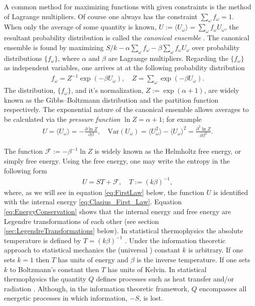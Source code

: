 \documentclass[english,12pt]{ttuthes}
\newcommand{\Fc}{\mathcal{F}}
\begin{document}
A common method for maximizing functions with given constraints is the
method of Lagrange multipliers. Of course one always has the
constraint $\sum_\omega f_\omega=1$. When only the average of some quantity is
known, $U:=\langle U_\omega\rangle=\sum_\omega f_\omega U_\omega$, the resultant probability 
distribution is called the \emph{canonical ensemble}
\cite{Robertson-1993}.  The canonical ensemble is found by maximizing 
$S/k-\alpha\sum_\omega f_\omega-\beta\sum_\omega f_\omega U_\omega$ over probability distributions 
$\{f_\omega\}$, where $\alpha$ and $\beta$ are Lagrange multipliers. Regarding the
$\{f_\omega\}$ as independent variables, one arrives at at the following
probability distribution
\cite{Robertson-1993,Balian:NCB:471,Firas}     
%
\begin{align}	\label{eq:Cannonical_Ensemble}
	f_\omega = Z^{-1}\exp{(-\beta U_\omega)}, \quad
	Z  = \sum_\omega \exp(-\beta U_\omega).
\end{align}
%
The distribution, $\{f_\omega\}$, and it's normalization, $Z:= \exp(\alpha+1)$,
are widely known as the Gibbs--Boltzmann distribution and the
partition function respectively. The exponential nature of 
the canonical ensemble allows averages to be calculated via the
\emph{pressure function} $\ln{Z}=\alpha+1$; for example
\cite{Robertson-1993,Chandler-1987} 
%
\begin{align}
  U=\langle U_\omega\rangle=-\frac{\partial\ln{Z}}{\partial\beta}, \quad
  \text{Var}(U_\omega)=\langle U_\omega^2\rangle-\langle U_\omega\rangle^2=\frac{\partial^2\ln{Z}}{\partial\beta^2}.
\end{align}
%

The function $\Fc:=-\beta^{-1}\ln{Z}$ is widely known as the
Helmholtz free energy, or simply free energy. Using the free energy,
one may write the entropy in the following form \cite{Robertson-1993}   
% 
\begin{align}
  \label{eq:EnergyConservation}
  U=ST+\Fc,   
      \quad T:=(k\beta)^{-1},
\end{align}
%
where, as we will see in equation \eqref{eq:FirstLaw} below, the
function $U$ is identified with the internal energy
\eqref{eq:Clasius_First_Law}. Equation \eqref{eq:EnergyConservation}
shows that the internal energy and free energy are Legendre
transformations of each other (see section
\ref{sec:LegendreTransformations} below). In statistical thermophysics
the absolute temperature is defined by $T=(k\beta)^{-1}$
\cite{Thompson-1988}. Under the information theoretic approach to
statistical mechanics the (universal \cite{Firas}) constant $k$ is
arbitrary. If one sets $k=1$ then $T$ has units of energy and $\beta$ is
the inverse temperature. If one sets $k$ to Boltzmann's constant then
$T$ has units of Kelvin. In statistical thermophysics the quantity $Q$
defines processes such as heat transfer and/or radiation
\cite{Bobbio-2000}. Although, in the information theoretic framework,
$Q$ encompasses all energetic processes in which information, $-S$, is
lost.
\end{document}
